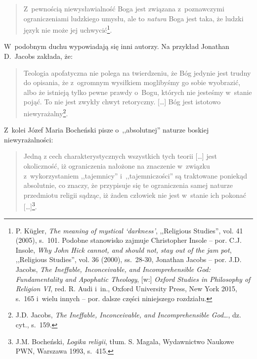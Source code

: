\begin{quote}
Z~pewnością niewysławialność Boga jest związana z~poznawczymi ograniczeniami ludzkiego umysłu, ale to \textit{natura} Boga jest taka, że ludzki język nie może jej uchwycić\footnote{P. Kügler, \textit{The meaning of mystical ‘darkness'}, ,,Religious Studies'', vol. 41 (2005), s.~101. Podobne stanowisko zajmuje Christopher Insole -- por. C.J. Insole, \textit{Why John Hick cannot, and should not, stay out of the jam pot}, ,,Religious Studies'', vol. 36 (2000), ss.~28-30, Jonathan Jacobs -- por. J.D. Jacobs, \textit{The Ineffable, Inconceivable, and Incomprehensible God: Fundamentality and Apophatic Theology}, [w:] \textit{Oxford Studies in Philosophy of Religion VI}, red. R. Audi i~in., Oxford University Press, New York 2015, s.~165 i~wielu innych -- por. dalsze części niniejszego rozdziału.}.
\end{quote}

W~podobnym duchu wypowiadają się inni autorzy. Na przykład Jonathan D.~Jacobs zakłada, że:

\begin{quote}
Teologia apofatyczna nie polega na twierdzeniu, że Bóg jedynie jest trudny do opisania, że z~ogromnym wysiłkiem moglibyśmy go sobie wyobrazić, albo że istnieją tylko pewne prawdy o~Bogu, których nie jesteśmy w~stanie pojąć. To nie jest zwykły chwyt retoryczny. [\ldots] Bóg jest istotowo niewyrażalny\footnote{J.D. Jacobs, \textit{The Ineffable, Inconceivable, and Incomprehensible God}\ldots, dz. cyt., s.~159.}.
\end{quote}
Z~kolei Józef Maria Bocheński pisze o~,,absolutnej'' naturze boskiej niewyrażalności:

\begin{quote}
Jedną z cech charakterystycznych wszystkich tych teorii [\ldots] jest okoliczność, iż ograniczenia nałożone na znaczenie w~związku z~wykorzystaniem ,,tajemnicy'' i~,,tajemniczości'' są traktowane poniekąd absolutnie, co znaczy, że przypisuje się te ograniczenia samej naturze przedmiotu religii sądząc, iż żaden człowiek nie jest w~stanie ich pokonać [\ldots]\footnote{J.M. Bocheński, \textit{Logika religii}, tłum. S. Magala, Wydawnictwo Naukowe PWN, Warszawa 1993, s.~415.}.
\end{quote}

